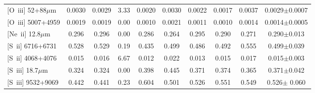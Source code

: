 \documentclass[twocolumn]{aastex62}
\begin{document}
\begin{CJK*}{UTF8}{gbsn}
\begin{table*}
\begin{center}
\begin{minipage}{13.5cm}
\begin{tabular}{@{}lccccccccc}
{[O~\sc iii]} 52+88$\mu$m       & 0.0030 &  0.0029 &  3.33  & 0.0020 & 0.0030 & 0.0022 & 0.0017 & 0.0037     & 0.0029$\pm$0.0007\\ 
{[O~\sc iii]} 5007+4959            & 0.0019 & 0.0019  &  0.00  & 0.0010 & 0.0021 & 0.0011 & 0.0010 & 0.0014    & 0.0014$\pm$0.0005 \\ 
{[Ne~\sc ii]} 12.8$\mu$m         & 0.296   & 0.296   &  0.00  & 0.286   & 0.264   & 0.295   & 0.290   & 0.271    &  0.290$\pm$0.013\\ 
{[S~\sc ii]} 6716+6731             & 0.528   & 0.529   & 0.19  & 0.435   & 0.499   & 0.486   & 0.492   & 0.555    &   0.499$\pm$0.039\\ 
{[S~\sc ii]} 4068+4076             & 0.015   & 0.016   & 6.67  & 0.012   & 0.022   & 0.013   & 0.015   & 0.017    &  0.015$\pm$0.003 \\ 
{[S~\sc iii]} 18.7$\mu$m          & 0.324   & 0.324   &  0.00  & 0.398   & 0.445   & 0.371   & 0.374    & 0.365    &  0.371$\pm$0.042 \\ 
{[S~\sc iii]} 9532+9069            & 0.442   & 0.441   &  0.23  & 0.604   & 0.501   & 0.526   & 0.551    & 0.549    &   0.526$\pm$ 0.060\\ 
\hline
\end{tabular}
\end{minipage}
\end{center}
\end{table*}



\end{CJK*}
\end{document}
